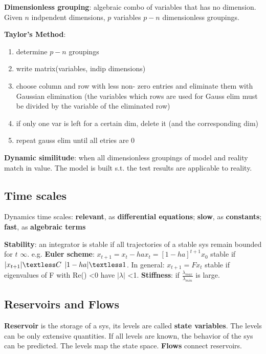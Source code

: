 \textbf{Dimensionless grouping}: algebraic combo of variables that has no dimension.
Given $n$ indpendent dimensions, $p$ variables \textrightarrow $p-n$ dimensionless groupings.

\textbf{Taylor's Method}:
\begin{enumerate}[label=$\bullet$]
	\item determine $p-n$ groupings
	\item write matrix(variables, indip 					dimensions)
	\item choose column and row with less non-		zero entries and eliminate them with 			Gaussian elimination (the variables which 		rows are used for Gauss elim must be 			divided by the variable of the eliminated 		row)
	\item if only one var is left for a 				certain dim, delete it (and the 				corresponding dim)
	\item repeat gauss elim until all etries 		are 0
\end{enumerate}

\textbf{Dynamic similitude}: when all dimensionless groupings of model and reality match in value. The model is built s.t. the test results are applicable to reality.

\subsection{Time scales}
Dynamics \textrightarrow time scales:  \textbf{relevant}, as \textbf{differential equations}; \textbf{slow}, as \textbf{constants}; \textbf{fast}, as \textbf{algebraic terms}

\textbf{Stability}: an integrator is stable if all trajectories of a stable sys remain bounded for $t$ \textrightarrow $\infty$.
e.g. \textbf{Euler scheme}: $x_{t+1}=x_{t}-hax_{t}=[1-ha]^{t+1}x_0$ stable if \textrightarrow $|x_{t+1}| \textless C$ \textrightarrow $|1-ha| \textless 1$.
In general: $x_{t+1}=Fx_{t}$ stable if eigenvalues \lambda of F with Re(\lambda) \textless 0 have $|\lambda|$ \textless 1.
\textbf{Stiffness}: if $\frac{\lambda_{max}}{\lambda_{min}}$ is large.

\subsection{Reservoirs and Flows}
\textbf{Reservoir} is the storage of a sys, its levels are called \textbf{state variables}. The levels can be only extensive quantities. If all levels are known, the behavior of the sys can be predicted. The levels map the state space.
\textbf{Flows} connect reservoirs.

